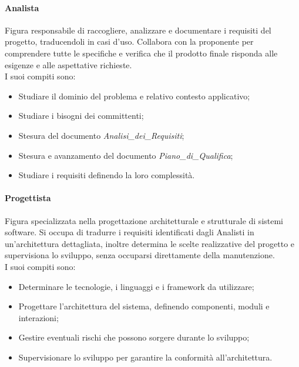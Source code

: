 \documentclass[10pt]{article}
\begin{document}
\begin{justify}
        \paragraph{Analista}
        Figura responsabile di raccogliere, analizzare e documentare i requisiti del progetto, traducendoli in casi d'uso. Collabora con la proponente per comprendere tutte le specifiche e verifica che il prodotto finale risponda alle esigenze e alle aspettative richieste.\\
        I suoi compiti sono:
        \begin{itemize}
            \item Studiare il dominio del problema e relativo contesto applicativo;
            \item Studiare i bisogni dei committenti;
            \item Stesura del documento \textit{Analisi\_dei\_Requisiti};
            \item Stesura e avanzamento del documento \textit{Piano\_di\_Qualifica};
            \item Studiare i requisiti definendo la loro complessità.
        \end{itemize}

        \paragraph{Progettista}
        Figura specializzata nella progettazione architetturale e strutturale di sistemi software. Si occupa di tradurre i requisiti identificati dagli Analisti in un'architettura dettagliata, inoltre determina le scelte realizzative del progetto e supervisiona lo sviluppo, senza occuparsi direttamente della manutenzione.\\
        I suoi compiti sono:
        \begin{itemize}
            \item Determinare le tecnologie, i linguaggi e i framework da utilizzare;
            \item Progettare l'architettura del sistema, definendo componenti, moduli e interazioni;
            \item Gestire eventuali rischi che possono sorgere durante lo sviluppo;
            \item Supervisionare lo sviluppo per garantire la conformità all'architettura.
        \end{itemize}


\end{justify}
\end{document}
